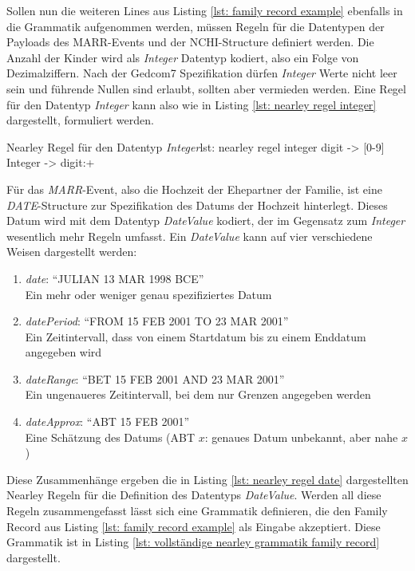 Sollen nun die weiteren Lines aus Listing \ref{lst: family record example} ebenfalls in die Grammatik aufgenommen werden, müssen Regeln für die Datentypen der Payloads des MARR-Events und der NCHI-Structure definiert werden. Die Anzahl der Kinder wird als  \textit{Integer} Datentyp kodiert, also ein Folge von Dezimalziffern. Nach der Gedcom7 Spezifikation dürfen \textit{Integer} Werte nicht leer sein und führende Nullen sind erlaubt, sollten aber vermieden werden. Eine Regel für den Datentyp \textit{Integer} kann also wie in Listing \ref{lst: nearley regel integer} dargestellt, formuliert werden.
\vspace{1em}
\begin{javascript}{Nearley Regel für den Datentyp \textit{Integer}}{lst: nearley regel integer}
	digit    ->  [0-9]
	Integer  ->  digit:+
\end{javascript}
\vspace{1em}
Für das \textit{MARR}-Event, also die Hochzeit der Ehepartner der Familie, ist eine\\\textit{DATE}-Structure zur Spezifikation des Datums der Hochzeit hinterlegt. Dieses Datum wird mit dem Datentyp \textit{DateValue} kodiert, der im Gegensatz zum \textit{Integer} wesentlich mehr Regeln umfasst. Ein \textit{DateValue} kann auf vier verschiedene Weisen dargestellt werden:
\begin{enumerate}
	\item \textit{date}: ``JULIAN 13 MAR 1998 BCE''\\Ein mehr oder weniger genau spezifiziertes Datum
	\item \textit{datePeriod}: ``FROM 15 FEB 2001 TO 23 MAR 2001''\\Ein Zeitintervall, dass von einem Startdatum bis zu einem Enddatum angegeben wird
	\item \textit{dateRange}: ``BET 15 FEB 2001 AND 23 MAR 2001''\\Ein ungenaueres Zeitintervall, bei dem nur Grenzen angegeben werden
	\item \textit{dateApprox}: ``ABT 15 FEB 2001''\\Eine Schätzung des Datums (ABT $x$: genaues Datum unbekannt, aber nahe $x$)
\end{enumerate}
Diese Zusammenhänge ergeben die in Listing \ref{lst: nearley regel date} dargestellten Nearley Regeln für die Definition des Datentyps \textit{DateValue}.
Werden all diese Regeln zusammengefasst lässt sich eine Grammatik definieren, die den Family Record aus Listing \ref{lst: family record example} als Eingabe akzeptiert. Diese Grammatik ist in Listing \ref{lst: vollständige nearley grammatik family record} dargestellt.


